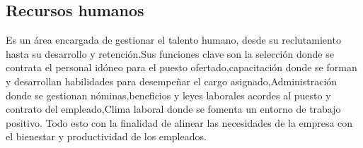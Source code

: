 
\subsection{Recursos humanos}
Es un área encargada de gestionar el talento humano, desde su reclutamiento hasta su desarrollo y retención.Sus funciones clave son la selección donde se contrata el personal idóneo para el puesto ofertado,capacitación donde se forman y desarrollan habilidades para desempeñar el cargo asignado,Administración donde se gestionan nóminas,beneficios y leyes laborales acordes al puesto y contrato del empleado,Clima laboral donde se fomenta un entorno de trabajo positivo. Todo esto con la finalidad de alinear las necesidades de la empresa con el bienestar y productividad de los empleados.
